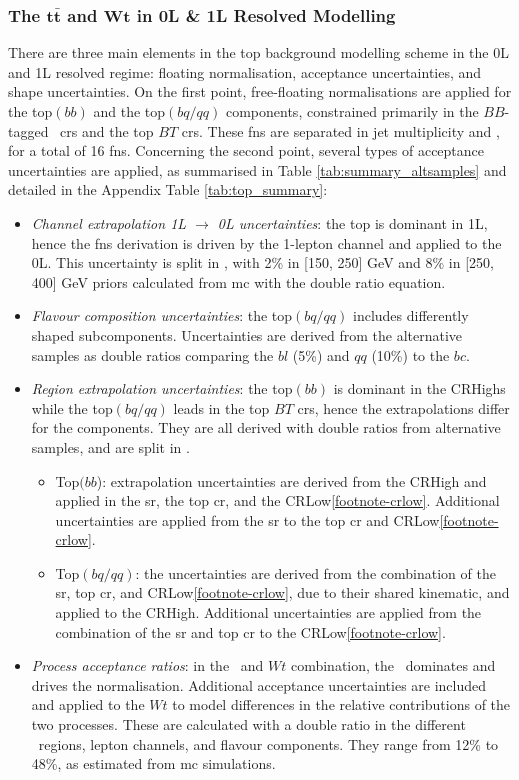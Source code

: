 \subsubsection{The $\boldsymbol{t\bar{t}}$ and $\boldsymbol{Wt}$ in 0L \& 1L Resolved Modelling}
There are three main elements in the top background modelling scheme in the 0L and 1L resolved regime: floating normalisation, acceptance uncertainties, and shape uncertainties. On the first point, free-floating normalisations are applied for the top$(bb)$ and the top$(bq/qq)$ components, constrained primarily in the $BB$-tagged \highdr\ \glspl{cr} and the top $BT$ \glspl{cr}. These \glspl{fn} are separated in jet multiplicity and \ptv, for a total of 16 \glspl{fn}. Concerning the second point, several types of acceptance uncertainties are applied, as summarised in Table \ref{tab:summary_altsamples} and detailed in the Appendix Table \ref{tab:top_summary}:
\begin{itemize}[leftmargin=*]
    \item \textit{Channel extrapolation 1L $\rightarrow$ 0L uncertainties}: the top is dominant in 1L, hence the \glspl{fn} derivation is driven by the 1-lepton channel and applied to the 0L. This uncertainty is split in \ptv, with 2\% in [150, 250] GeV and 8\% in [250, 400] GeV priors calculated from \gls{mc} with the double ratio equation.
    \item \textit{Flavour composition uncertainties}: the top$(bq/qq)$ includes differently shaped subcomponents. Uncertainties are derived from the alternative samples as double ratios comparing the $bl$ (5\%) and $qq$ (10\%) to the $bc$. 
    \item \textit{Region extrapolation uncertainties}: the top$(bb)$ is dominant in the CRHighs while the top$(bq/qq)$ leads in the top $BT$ \glspl{cr}, hence the extrapolations differ for the components. They are all derived with double ratios from alternative samples, and are split in \ptv.
    \begin{itemize}
        \item Top$(bb$): extrapolation uncertainties are derived from the CRHigh and applied in the \gls{sr}, the top \gls{cr}, and the CRLow\cref{footnote-crlow}. Additional uncertainties are applied from the \gls{sr} to the top \gls{cr} and CRLow\cref{footnote-crlow}. 
        \item Top$(bq/qq)$: the uncertainties are derived from the combination of the \gls{sr}, top \gls{cr}, and CRLow\cref{footnote-crlow}, due to their shared kinematic, and applied to the CRHigh. Additional uncertainties are applied from the combination of the \gls{sr} and top \gls{cr} to the CRLow\cref{footnote-crlow}.
    \end{itemize}
    \item \textit{Process acceptance ratios}: in the \ttb\ and $Wt$ combination, the \ttb\ dominates and drives the normalisation. Additional acceptance uncertainties are included and applied to the $Wt$ to model differences in the relative contributions of the two processes. These are calculated with a double ratio in the different \ptv\ regions, lepton channels, and flavour components. They range from 12\% to 48\%, as estimated from \gls{mc} simulations.
\end{itemize}
